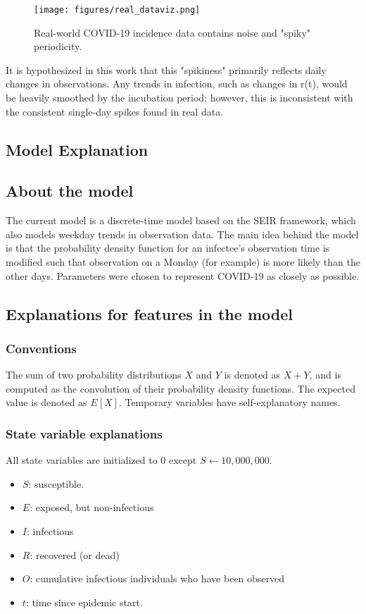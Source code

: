 \documentclass{article}
\begin{document}
\clearpage
\begin{figure}[h!]
\centering
\texttt{[image: figures/real\_dataviz.png]}
\caption{Real-world COVID-19 incidence data contains noise and "spiky" periodicity. \cite{OWID}}
\end{figure}


It is hypothesized in this work that this "spikiness" primarily reflects daily changes in observations. Any trends in infection, such as changes in r(t), would be heavily smoothed by the incubation period; however, this is inconsistent with the consistent single-day spikes found in real data.

\subsection{Model Explanation}

\subsection{About the model}
The current model is a discrete-time model based on the SEIR framework, which also models weekday trends in observation data. The main idea behind the model is that the probability density function for an infectee's observation time is modified such that observation on a Monday (for example) is more likely than the other days. Parameters were chosen to represent COVID-19 as closely as possible.

\subsection{Explanations for features in the model}

\subsubsection{Conventions}
The sum of two probability distributions $X$ and $Y$ is denoted as $X+Y$, and is computed as the convolution of their probability density functions. The expected value is denoted as $E[X]$. Temporary variables have self-explanatory names.

\subsubsection{State variable explanations}
All state variables are initialized to 0 except $S \gets 10,000,000$. 

\begin{itemize}
    \item $S$: susceptible.
    \item $E$: exposed, but non-infectious
    \item $I$: infectious
    \item $R$: recovered (or dead)
    \item $O$: cumulative infectious individuals who have been observed 
    \item $t$: time since epidemic start.
\end{itemize}
\end{document}
